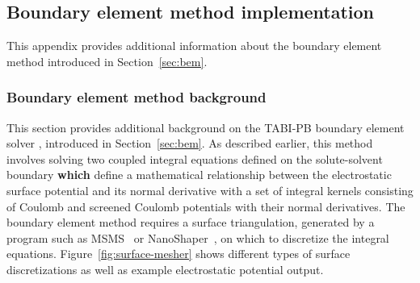 \documentclass[12pt,titlepage]{article}
\newcommand{\revision}[1]{\color{red} \textbf{#1} \leavevmode\color{black}}
\begin{document}
\subsection{Boundary element method implementation} \label{app:bem}
This appendix provides additional information about the boundary element method introduced in Section~\ref{sec:bem}.

\subsubsection{Boundary element method background}
This section provides additional background on the TABI-PB boundary element solver \cite{Geng2013}, introduced in Section~\ref{sec:bem}.
As described earlier, this method involves solving two coupled integral equations defined on the solute-solvent boundary \revision{which} define a mathematical relationship between the electrostatic surface potential and its normal derivative with a set of integral kernels consisting of Coulomb and screened Coulomb potentials with their normal derivatives.
The boundary element method requires a surface triangulation, generated by a program such as MSMS~\cite{Sanner1995} or NanoShaper~\cite{Decherchi2013}, on which to discretize the integral equations.
Figure~\ref{fig:surface-mesher} shows different types of surface discretizations as well as example electrostatic potential output.
\end{document}
